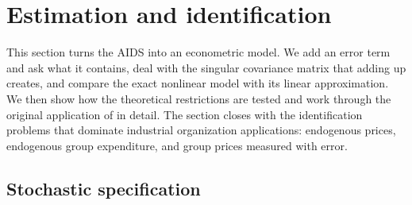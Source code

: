 \section{Estimation and identification}\label{sec:05-estimation}

This section turns the AIDS into an econometric model. We add an error term and ask what it contains,
deal with the singular covariance matrix that adding up creates, and compare the exact nonlinear model
with its linear approximation. We then show how the theoretical restrictions are tested and work through
the original application of \citet{DeatonMuellbauer1980a} in detail. The section closes with the
identification problems that dominate industrial organization applications: endogenous prices,
endogenous group expenditure, and group prices measured with error.

\subsection{Stochastic specification}\label{sec:05-stochastic}

